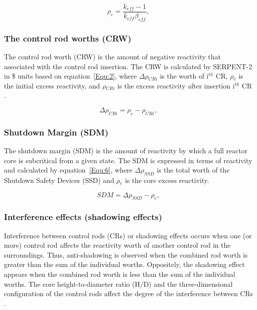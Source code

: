 \begin{equation}
\label{Equ:1}
{{\rho}_{e}}=\dfrac{{k_{eff}}-1}{{k_{eff}}{{\beta}_{eff}}},
\end{equation}

\subsubsection{The control rod worths (CRW)}

The control rod worth (CRW) is the amount of negative reactivity that associated with the control rod insertion. The CRW is calculated by SERPENT-2 in \$ units based on equation~\ref{Equ:2}, where $\Delta\rho$$_{CRi}$ is the worth of i$^{th}$ CR, $\rho$$_e$ is the initial excess reactivity, and $\rho$$_{CRi}$ is the excess reactivity after insertion i$^{th}$ CR \cite{vcerba2017optimization}.

\begin{equation}
\label{Equ:2}
{{\Delta}{\rho}_{CRi}}={{\rho}_{e}}-{{\rho}_{CRi}},
\end{equation}

\subsubsection{Shutdown Margin (SDM)}

The shutdown margin (SDM) is the amount of reactivity by which a full reactor core is subcritical from a given state. The SDM is expressed in terms of reactivity and calculated by equation~\ref{Equ:6}, where $\Delta\rho_{SSD}$ is the total worth of the Shutdown Safety Devices (SSD) and $\rho$$_e$ is the core excess reactivity.

\begin{equation}
\label{Equ:6}
{SDM}={{\Delta}{\rho}_{SSD}}-{{\rho}_{e}},
\end{equation}

\subsubsection{Interference effects (shadowing effects)}

Interference between control rods (CRs) or shadowing effects occurs when one 
(or more) control rod affects the reactivity worth of another control rod in 
the surroundings. Thus, anti-shadowing is observed when the combined rod worth 
is greater than the sum of the individual worths. Oppositely, the shadowing 
effect appears when the combined rod worth is less than the sum of the 
individual worths. The core height-to-diameter ratio (H/D) and the 
three-dimensional configuration of the control rods affect the degree of the 
interference between CRs \cite{girardin2007control}. 

